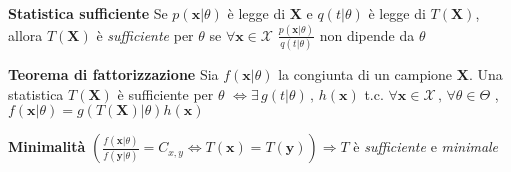 \documentclass[openany]{book} %
\begin{document}
\textbf{Statistica sufficiente} Se $p(\boldsymbol{x}|\theta)$ è legge di $\boldsymbol{X}$ e $q(t|\theta)$ è legge di $T(\boldsymbol{X})$, allora $T(\boldsymbol{X})$ è \textit{sufficiente} per $\theta$ se $\forall \boldsymbol{x}\in \mathcal{X}$ $\frac{p(\boldsymbol{x}|\theta)}{q(t|\theta)}$ non dipende da $\theta$

\textbf{Teorema di fattorizzazione} Sia $f(\boldsymbol{x}|\theta)$ la congiunta di un campione $\boldsymbol{X}$. Una statistica $T(\boldsymbol{X})$ è sufficiente per $\theta$ $\Leftrightarrow \exists \,g(t|\theta)\,,\,h(\boldsymbol{x})$ t.c. $\forall \boldsymbol{x}\in \mathcal{X}\,,\,\forall \theta\in\Theta$ , $f(\boldsymbol{x}|\theta)=g(T(\boldsymbol{X})|\theta)h(\boldsymbol{x})$

\textbf{Minimalità} $(\frac{f(\boldsymbol{x}|\theta)}{f(\boldsymbol{y}|\theta)}=C_{x,y}\Leftrightarrow T(\boldsymbol{x})=T(\boldsymbol{y}))\Rightarrow T$ è \textit{sufficiente} e \textit{minimale}




\end{document}
